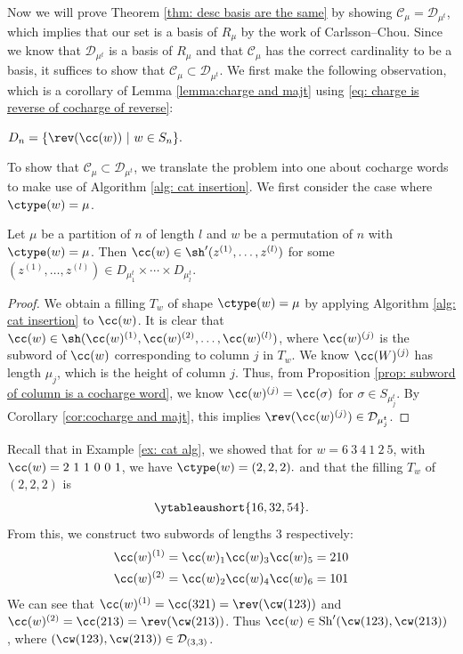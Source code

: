 Now we will prove Theorem \ref{thm: desc basis are the same} by showing $\mathcal{C_\mu} = \mathcal{D}_{\mu^t}$, which implies that our set is a basis of $R_{\mu}$ by the work of Carlsson--Chou.
Since we know that $\mathcal{D}_{\mu^t}$ is a basis of $R_{\mu}$ and that $\mathcal{C_\mu}$ has the correct cardinality to be a basis, it suffices to show that $\mathcal{C}_\mu\subset \mathcal{D}_{\mu^t}$.
We first make the following observation, which is a corollary of Lemma \ref{lemma:charge and majt} using \eqref{eq: charge is reverse of cocharge of reverse}:

\begin{coro}\label{cor:cocharge and majt} $D_n = \{\rev(\cc(w)) \ | \ w \in S_n\}.$
\end{coro}

To show that $\mathcal{C}_\mu\subset \mathcal{D}_{\mu^t}$, we translate the problem into one about cocharge words to make use of Algorithm \ref{alg: cat insertion}. We first consider the case where $\ctype(w) = \mu$.

\begin{prop}\label{prop: ctype implies shuffle}
    Let $\mu$ be a partition of $n$ of length $l$ and  $w$ be a permutation of $n$ with $\ctype(w) = \mu$. 
    Then $\cc(w) \in \sh'(z^{(1)},\dots , z^{(l)})$ for some $(z^{(1)},\dots , z^{(l)})\in D_{\mu^t_1}\times \cdots \times D_{\mu^t_l}$.
\end{prop}

\begin{proof}
    We obtain a filling $T_w$ of shape $\ctype(w) = \mu $ by applying Algorithm \ref{alg: cat insertion} to $\cc(w)$.
    It is clear that $\cc(w) \in \sh (\cc(w)^{(1)}, \cc(w)^{(2)}, \dots, \cc(w)^{(l)})$, where $\cc(w)^{(j)}$ is the subword of $\cc(w)$ corresponding to column $j$ in $T_w$. We know $\cc(W)^{(j)}$ has length $\mu_j$, which is the height of column $j$. 
    Thus, from Proposition \ref{prop: subword of column is a cocharge word}, we know $\cc(w)^{(j)} = \cc(\sigma)$ for $\sigma\in S_{\mu^t_j}$. 
    By Corollary \ref{cor:cocharge and majt}, this implies  $\rev(\cc(w)^{(j)}) \in \mathcal{D}_{\mu^t_j}$.
\end{proof}

\begin{ex}\label{ex: cat ex}
    Recall that in Example \ref{ex: cat alg}, we showed that for $w = 6 \ 3 \ 4  \ 1 \ 2\ 5 $, with $\cc(w) = 2 \ 1 \ 1  \ 0 \ 0\ 1 $, we have  $\ctype(w) = (2,2,2).$ and that the filling $T_w$ of $ (2,2,2) $ is 
        \[\ytableaushort{16,32,54}. \] 
    From this, we construct two subwords of lengths $3$ respectively:
    \begin{align*}
        \cc(w)^{(1)} &= \cc(w)_1\cc(w)_3\cc(w)_5 = 210\\
         \cc(w)^{(2)} &= \cc(w)_2\cc(w)_4\cc(w)_6 = 101
    \end{align*}
    We can see that $\cc(w)^{(1)} = \cc(321) = \rev(\cw(123))$ and $\cc(w)^{(2)} = \cc(213) = \rev(\cw(213))$. 
    Thus $\cc(w)\in \text{Sh} '(\cw(123), \cw(213))$ , where $(\cw(123), \cw(213)) \in \mathcal{D}_{(3,3)}$.
\end{ex}

